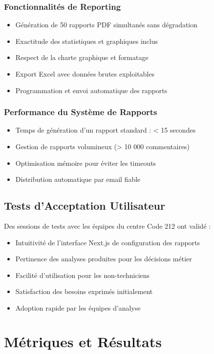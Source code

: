 \subsubsection{Fonctionnalités de Reporting}
\begin{itemize}
    \item Génération de 50 rapports PDF simultanés sans dégradation
    \item Exactitude des statistiques et graphiques inclus
    \item Respect de la charte graphique et formatage
    \item Export Excel avec données brutes exploitables
    \item Programmation et envoi automatique des rapports
\end{itemize}

\subsubsection{Performance du Système de Rapports}
\begin{itemize}
    \item Temps de génération d'un rapport standard : < 15 secondes
    \item Gestion de rapports volumineux (> 10 000 commentaires)
    \item Optimisation mémoire pour éviter les timeouts
    \item Distribution automatique par email fiable
\end{itemize}

\subsection{Tests d'Acceptation Utilisateur}

Des sessions de tests avec les équipes du centre Code 212 ont validé :
\begin{itemize}
    \item Intuitivité de l'interface Next.js de configuration des rapports
    \item Pertinence des analyses produites pour les décisions métier
    \item Facilité d'utilisation pour les non-techniciens
    \item Satisfaction des besoins exprimés initialement
    \item Adoption rapide par les équipes d'analyse
\end{itemize}

\section{Métriques et Résultats}

